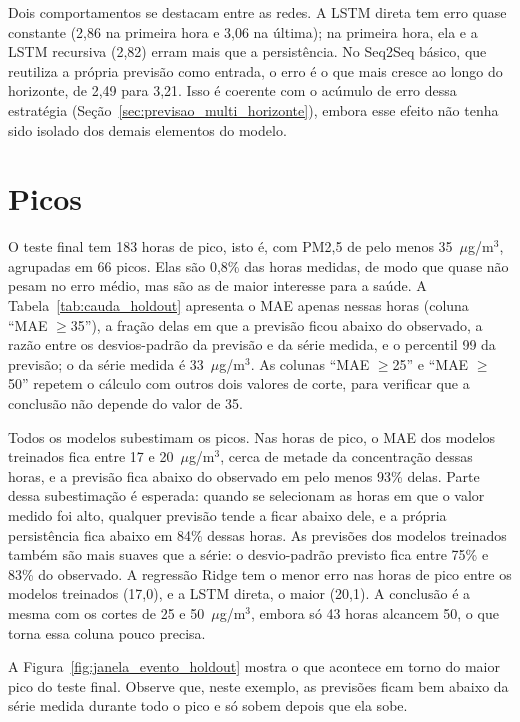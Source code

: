 Dois comportamentos se destacam entre as redes. A LSTM direta tem erro quase constante (2,86 na primeira hora e 3,06 na última); na primeira hora, ela e a LSTM recursiva (2,82) erram mais que a persistência. No Seq2Seq básico, que reutiliza a própria previsão como entrada, o erro é o que mais cresce ao longo do horizonte, de 2,49 para 3,21. Isso é coerente com o acúmulo de erro dessa estratégia (Seção~\ref{sec:previsao_multi_horizonte}), embora esse efeito não tenha sido isolado dos demais elementos do modelo.

\section{Picos}
\label{sec:picos}

O teste final tem 183 horas de pico, isto é, com PM2,5 de pelo menos 35~\(\mu\)g/m\(^3\), agrupadas em 66 picos. Elas são 0,8\% das horas medidas, de modo que quase não pesam no erro médio, mas são as de maior interesse para a saúde. A Tabela~\ref{tab:cauda_holdout} apresenta o MAE apenas nessas horas (coluna ``MAE \(\geq\)35''), a fração delas em que a previsão ficou abaixo do observado, a razão entre os desvios-padrão da previsão e da série medida, e o percentil 99 da previsão; o da série medida é 33~\(\mu\)g/m\(^3\). As colunas ``MAE \(\geq\)25'' e ``MAE \(\geq\)50'' repetem o cálculo com outros dois valores de corte, para verificar que a conclusão não depende do valor de 35.


Todos os modelos subestimam os picos. Nas horas de pico, o MAE dos modelos treinados fica entre 17 e 20~\(\mu\)g/m\(^3\), cerca de metade da concentração dessas horas, e a previsão fica abaixo do observado em pelo menos 93\% delas. Parte dessa subestimação é esperada: quando se selecionam as horas em que o valor medido foi alto, qualquer previsão tende a ficar abaixo dele, e a própria persistência fica abaixo em 84\% dessas horas. As previsões dos modelos treinados também são mais suaves que a série: o desvio-padrão previsto fica entre 75\% e 83\% do observado. A regressão Ridge tem o menor erro nas horas de pico entre os modelos treinados (17,0), e a LSTM direta, o maior (20,1). A conclusão é a mesma com os cortes de 25 e 50~\(\mu\)g/m\(^3\), embora só 43 horas alcancem 50, o que torna essa coluna pouco precisa.

A Figura~\ref{fig:janela_evento_holdout} mostra o que acontece em torno do maior pico do teste final. Observe que, neste exemplo, as previsões ficam bem abaixo da série medida durante todo o pico e só sobem depois que ela sobe.

